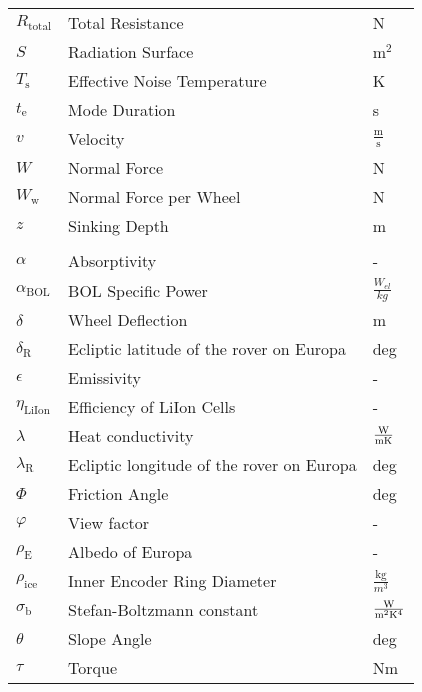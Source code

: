 \begin{longtable}[l]{lll}
\(R_\text{total}\)		&	Total Resistance							& N								\\
\(S\)					&	Radiation Surface							& m$^2$							\\
${T}_\text{s}$ 				&	Effective Noise Temperature					& K								\\
$t_\text{e}$			&	Mode Duration								& s								\\
\(v\)					&	Velocity									& \(\frac{\text{m}}{\text{s}}\)	\\
\(W\)					&	Normal Force 								& N								\\
\(W_\text{w}\)			&	Normal Force per Wheel						& N								\\
\(z\)					&	Sinking Depth								& m								\\
				&											& 							\\


$\alpha$				&	Absorptivity								& -  							\\
$\alpha_\text{BOL}$		&	BOL Specific Power							& $\frac{W_{el}}{kg}$			\\
\(\delta\)				&	Wheel Deflection							& m								\\
$\delta_\text{R}$		&	Ecliptic latitude of the rover on Europa	& deg						\\
\(\epsilon\)			&	Emissivity 									&	-							\\
$\eta_\text{LiIon}$		&	Efficiency of LiIon Cells					& -								\\
$\lambda$				&	Heat conductivity							& $\frac{{\rm W}}{{\rm m} {\rm K}}$			\\
$\lambda_\text{R}$		&	Ecliptic longitude of the rover on Europa	& deg						\\
\(\Phi\)				&	Friction Angle								& deg							\\
$\varphi$				&	View factor									& -								\\
\(\rho_\text{E}\)		&	Albedo of Europa			  				& -								\\
\(\rho_\text{ice}\)		&	Inner Encoder Ring Diameter  				&	\(\frac{\text{kg}}{m^3}\)	\\
$\sigma_\text{b}$ 		&	Stefan-Boltzmann constant					& $\frac{{\rm W}}{{\rm m}^2{\rm K}^4}$ 		\\
\(\theta\)				&	Slope Angle									& deg							\\
\(\tau\)				&	Torque										& Nm							\\




\end{longtable}

